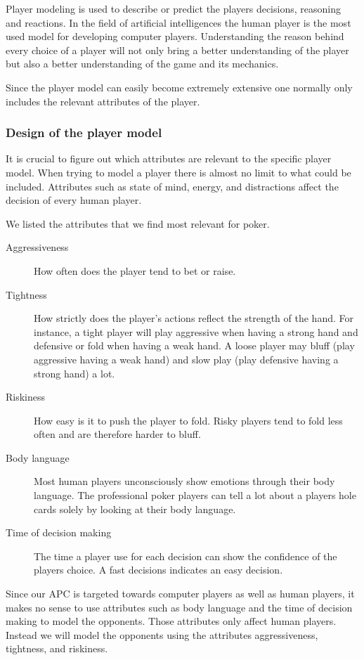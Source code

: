 Player modeling is used to describe or predict the players decisions, reasoning and reactions. In the field of artificial intelligences the human player is the most used model for developing computer players. Understanding the reason behind every choice of a player will not only bring a better understanding of the player but also a better understanding of the game and its mechanics.

Since the player model can easily become extremely extensive one normally only includes the relevant attributes of the player.

\subsubsection{Design of the player model}
It is crucial to figure out which attributes are relevant to the specific player model. When trying to model a player there is almost no limit to what could be included. Attributes such as state of mind, energy, and distractions affect the decision of every human player.  

We listed the attributes that we find most relevant for poker.

\begin{description}
\item[Aggressiveness] How often does the player tend to bet or raise.
\item[Tightness] How strictly does the player's actions reflect the strength of the hand. For instance, a tight player will play aggressive when having a strong hand and defensive or fold when having a weak hand. A loose player may bluff (play aggressive having a weak hand) and slow play (play defensive having a strong hand) a lot.
\item[Riskiness] How easy is it to push the player to fold. Risky players tend to fold less often and are therefore harder to bluff.
\item[Body language] Most human players unconsciously show emotions through their body language. The professional poker players can tell a lot about a players hole cards solely by looking at their body language.
\item[Time of decision making] The time a player use for each decision can show the confidence of the players choice. A fast decisions indicates an easy decision. 
\end{description}

Since our APC is targeted towards computer players as well as human players, it makes no sense to use attributes such as body language and the time of decision making to model the opponents. Those attributes only affect human players. Instead we will model the opponents using the attributes aggressiveness, tightness, and riskiness.

